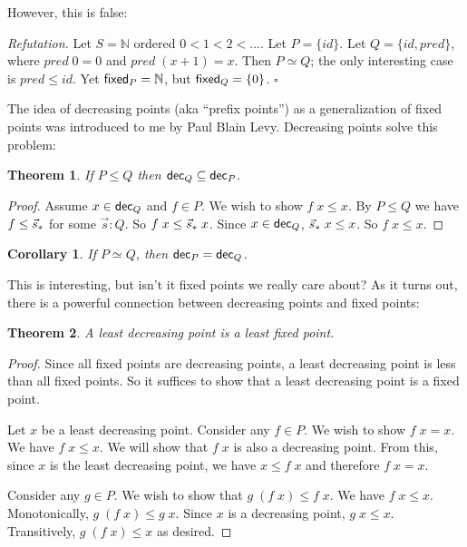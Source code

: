 \documentclass{article}
\newcommand{\N}{\mathbb{N}}
\newcommand{\todo}[1]{{\color{red}{#1}}}
\newtheorem{theorem}{Theorem}
\newtheorem{corollary}{Corollary}
\newenvironment{refutation}
  {\vspace{0.5em}\noindent\textit{Refutation.}}
  {\hfill$\square$\vspace{0.5em}}
\begin{document}
However, this is false:

\begin{refutation}
  Let $S = \N$ ordered $0 < 1 < 2 < ...$. Let $P = \{id\}$. Let $Q = \{id,
  pred\}$, where $pred\; 0 = 0$ and $pred\; (x+1) = x$. Then $P \simeq Q$; the
  only interesting case is $pred \le id$. Yet $\fixed{P} = \N$, but $\textsf{{fixed}}_{Q} =
  \{0\}$.
\end{refutation}

The idea of decreasing points (aka ``prefix points'') as a generalization of
fixed points was introduced to me by Paul Blain Levy. Decreasing points solve
this problem:

\begin{theorem}
  If $P \le Q$ then $\textsf{{dec}}_{Q} \subseteq \textsf{{dec}}_{P}$.
  \label{thm:dec-antitone}
\end{theorem}

\begin{proof}
  Assume $x \in \textsf{{dec}}_{Q}$ and $f \in P$. We wish to show $f\;x \le x$. By $P
  \le Q$ we have $f \le {\vec{s}_*}$ for some $\vec{s} : Q$. So $f\;x \le
  {\vec{s}_*}\;x$. Since $x \in \textsf{{dec}}_{Q}$, ${\vec{s}_*}\;x \le x$. So $f\; x \le x$.
\end{proof}

\todo{Maybe the ordering on programs is the opposite of what it should be?}

\begin{corollary}
  If $P \simeq Q$, then $\textsf{{dec}}_{P} = \textsf{{dec}}_{Q}$.
  \label{cor:simeq->dec}
\end{corollary}

This is interesting, but isn't it fixed points we really care about? As it turns
out, there is a powerful connection between decreasing points and fixed points:

\begin{theorem}
  A least decreasing point is a least fixed point.
\end{theorem}

\begin{proof}
  Since all fixed points are decreasing points, a least decreasing point is less
  than all fixed points. So it suffices to show that a least decreasing point is
  a fixed point.

  Let $x$ be a least decreasing point. Consider any $f \in P$. We wish to show
  $f\;x = x$. We have $f\; x \le x$. We will show that $f\;x$ is also a
  decreasing point. From this, since $x$ is the least decreasing point, we have
  $x \le f\;x$ and therefore $f\;x = x$.

  Consider any $g \in P$. We wish to show that $g\;(f\;x) \le f\; x$. We have
  $f\;x \le x$. Monotonically, $g\;(f\;x) \le g\;x$. Since $x$ is a decreasing
  point, $g\;x \le x$. Transitively, $g\;(f\;x) \le x$ as desired.
\end{proof}
\end{document}
